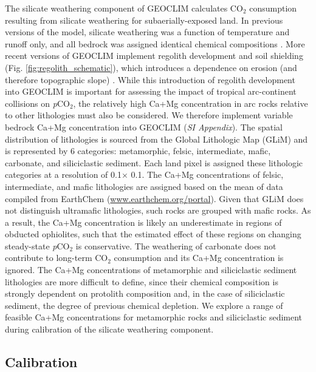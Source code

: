 \documentclass[9pt,twocolumn,twoside,lineno]{pnas-new}
\newcommand{\degrees}{\textdegree\xspace}
\newcommand{\pCOtwo}{\textit{p}CO$_{2}$\xspace}
\newcommand{\COtwo}{CO$_{2}$\xspace}
\newcommand{\SI}{\textit{SI Appendix}\xspace}
\begin{document}
The silicate weathering component of GEOCLIM calculates \COtwo consumption resulting from silicate weathering for subaerially-exposed land. In previous versions of the model, silicate weathering was a function of temperature and runoff only, and all bedrock was assigned identical chemical compositions \cite{Godderis2017c}. More recent versions of GEOCLIM implement regolith development and soil shielding (Fig. \ref{fig:regolith_schematic}), which introduces a dependence on erosion (and therefore topographic slope) \cite{Maffre2018a}. While this introduction of regolith development into GEOCLIM is important for assessing the impact of tropical arc-continent collisions on \pCOtwo, the relatively high Ca+Mg concentration in arc rocks relative to other lithologies must also be considered. We therefore implement variable bedrock Ca+Mg concentration into GEOCLIM (\SI). The spatial distribution of lithologies is sourced from the Global Lithologic Map (GLiM) \cite{Hartmann2012a} and is represented by 6 categories: metamorphic, felsic, intermediate, mafic, carbonate, and siliciclastic sediment. Each land pixel is assigned these lithologic categories at a resolution of 0.1\degrees $\times$ 0.1\degrees. The Ca+Mg concentrations of felsic, intermediate, and mafic lithologies are assigned based on the mean of data compiled from EarthChem (\url{www.earthchem.org/portal}). Given that GLiM does not distinguish ultramafic lithologies, such rocks are grouped with mafic rocks. As a result, the Ca+Mg concentration is likely an underestimate in regions of obducted ophiolites, such that the estimated effect of these regions on changing steady-state \pCOtwo is conservative. The weathering of carbonate does not contribute to long-term \COtwo consumption and its Ca+Mg concentration is ignored. The Ca+Mg concentrations of metamorphic and siliciclastic sediment lithologies are more difficult to define, since their chemical composition is strongly dependent on protolith composition and, in the case of siliciclastic sediment, the degree of previous chemical depletion. We explore a range of feasible Ca+Mg concentrations for metamorphic rocks and siliciclastic sediment during calibration of the silicate weathering component.

\subsection*{Calibration}
\end{document}
